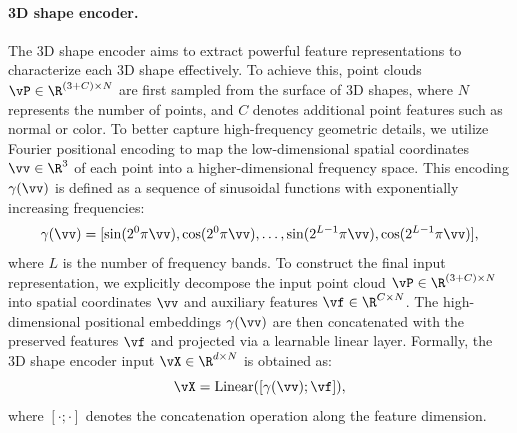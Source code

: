 \documentclass[../../book-main.tex]{subfiles}
\begin{document}
\paragraph{3D shape encoder.} The 3D shape encoder aims to extract powerful feature
representations to characterize each 3D shape effectively.
To achieve
this, point clouds \(\vP \in \R^{(3 + C) \times N}\) are first sampled
from the surface of 3D shapes, where \(N\) represents the number of
points, and \(C\) denotes additional point features such as normal or
color.
To better capture high-frequency geometric details, 
we utilize Fourier positional encoding to map the 
low-dimensional spatial coordinates 
\(\vv \in \R^3\) 
of each point into a higher-dimensional frequency space.
This encoding \(\gamma(\vv)\) is defined as a
sequence of sinusoidal functions with exponentially 
increasing frequencies:
\begin{equation}
\gamma(\vv) = [\sin(2^0\pi \vv), \cos(2^0\pi \vv), \dots, \sin(2^{L-1}\pi \vv), \cos(2^{L-1}\pi \vv)] ,
\end{equation}
where \(L\) is the number of frequency bands.
To construct the final input representation, we explicitly
decompose the input point cloud \(\vP \in \R^{(3+C) \times N}\) into spatial coordinates \(\vv\) and 
auxiliary features \(\vf \in \R^{C \times N}\).
The high-dimensional positional embeddings 
\(\gamma(\vv)\) are then concatenated with the 
preserved features \(\vf\) and projected via a 
learnable linear layer.
Formally, the 3D shape encoder input 
\(\vX \in \R^{d \times N}\) is obtained 
as:
\begin{equation}
\vX = \mathrm{Linear}([\gamma(\vv); \vf]) ,
\end{equation}
where \([\cdot ; \cdot]\) denotes the 
concatenation operation along the feature dimension.
\end{document}
